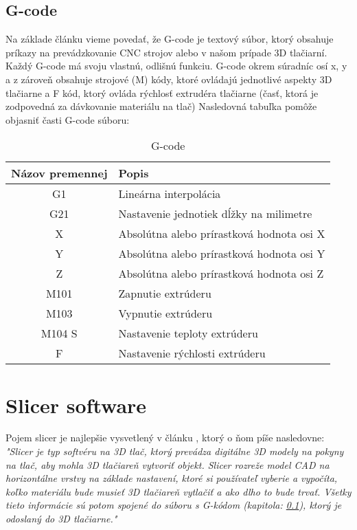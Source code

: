 \documentclass[10pt,twoside,slovak,a4paper]{article}
\begin{document}
\subsection{G-code}\label{formaty:G-code}
    Na základe článku \cite{6757836} vieme povedať, že G-code je textový súbor, ktorý obsahuje príkazy na prevádzkovanie CNC strojov alebo v našom prípade 3D tlačiarní. Každý G-code má svoju vlastnú, odlišnú funkciu. G-code okrem súradníc osí x, y a z zároveň obsahuje strojové (M) kódy, ktoré ovládajú jednotlivé aspekty 3D tlačiarne a F kód, ktorý ovláda rýchlosť extrudéra tlačiarne (časť, ktorá je zodpovedná za dávkovanie materiálu na tlač)
    Nasledovná tabuľka pomôže objasniť časti G-code súboru:
    \begin{table}[h]
        \centering
        \begin{tabular}{c|l}
        \textbf{Názov premennej} & \textbf{Popis} \\
        \hline
            G1 & Lineárna interpolácia   \\
            G21 & Nastavenie jednotiek dĺžky na milimetre  \\
            X & Absolútna alebo prírastková hodnota osi X  \\
            Y & Absolútna alebo prírastková hodnota osi Y \\
            Z & Absolútna alebo prírastková hodnota osi Z  \\
            M101 & Zapnutie extrúderu  \\
            M103  & Vypnutie extrúderu  \\
            M104 S & Nastavenie teploty extrúderu  \\
            F & Nastavenie rýchlosti extrúderu  \\
        \end{tabular}
        \caption{G-code}
        \label{tab:my_label}
    \end{table}
\newpage
\section{Slicer software} \label{Slicer}
    Pojem slicer je najlepšie vysvetlený v článku \cite{SONG2018276}, ktorý o ňom píše nasledovne:
    \newline
    \emph{"Slicer je typ softvéru na 3D tlač, ktorý prevádza digitálne 3D modely na pokyny na tlač, aby mohla 3D tlačiareň vytvoriť objekt. Slicer rozreže model CAD na horizontálne vrstvy na základe nastavení, ktoré si používateľ vyberie a vypočíta, koľko materiálu bude musieť 3D tlačiareň vytlačiť a ako dlho to bude trvať. Všetky tieto informácie sú potom spojené do súboru s G-kódom (kapitola: \ref{formaty:G-code}), ktorý je odoslaný do 3D tlačiarne."}
\end{document}
